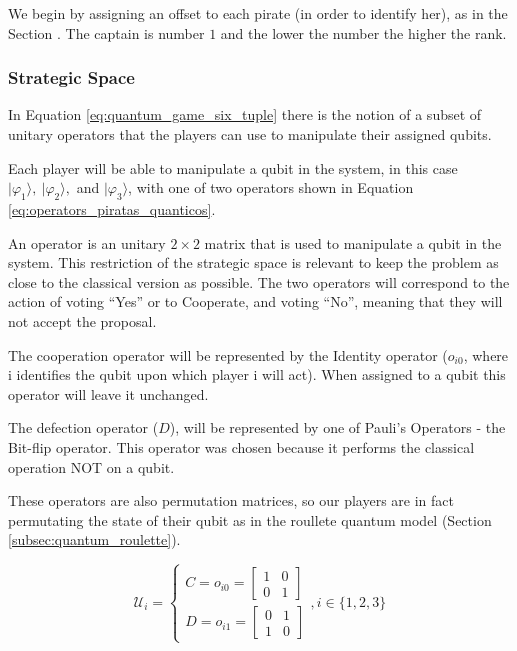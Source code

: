 We begin by assigning an offset to each pirate (in order to identify her), as in the Section \label{subsec:description}. The captain is number $1$ and the lower the number the higher the rank. 


\subsubsection{Strategic Space}
\label{subsec:strategic_space}

In Equation \ref{eq:quantum_game_six_tuple} there is the notion of a subset of unitary operators that the players can use to manipulate their assigned qubits. 

Each player will be able to manipulate a qubit in the system, in this case $\vert\varphi_{1}\rangle,\:\vert\varphi_{2}\rangle,$ and $\vert\varphi_{3}\rangle$, with one of two operators shown in Equation \ref{eq:operators_piratas_quanticos}. 

An operator is an unitary $2\times2$ matrix that is used to manipulate a qubit in the system.
This restriction of the strategic space is relevant to keep the problem as close to the classical version as possible. The two operators will correspond to the action of voting ``Yes'' or to Cooperate, and voting ``No'', meaning that they will not accept the proposal.  

The cooperation operator will be represented by the Identity operator ($o_{i0}$, where i identifies the qubit upon which player i will act). When assigned to a qubit this operator will leave it unchanged. 

The defection operator ($D$), will be represented by one of Pauli's Operators - the Bit-flip operator. This operator was chosen because it performs the classical operation NOT on a qubit.

These operators are also permutation matrices, so our players are in fact permutating the state of their qubit as in the roullete quantum model (Section \ref{subsec:quantum_roulette}).

\begin{equation}
\label{eq:operators_piratas_quanticos}
\mathcal{U}_{i} = \begin{cases}
C = o_{i0}=\left[\begin{array}{cc}
1 & 0\\
0 & 1
\end{array}\right]\\
D = o_{i1}=\left[\begin{array}{cc}
0 & 1\\
1 & 0
\end{array}\right]
\end{cases} , i \in \{ 1, 2, 3 \}
\end{equation}


